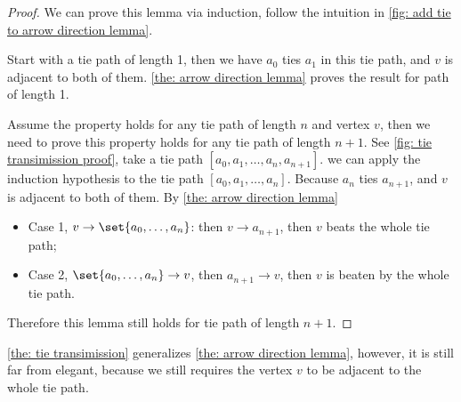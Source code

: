 \begin{proof}
  We can prove this lemma via induction,
  follow the intuition in
  \cref{fig: add tie to arrow direction lemma}.

  Start with a tie path of length 1,
  then we have \(a_0\) ties \(a_1\) in this tie path,
  and \(v\) is adjacent to both of them.
  \cref{the: arrow direction lemma} proves the result
  for path of length 1.

  Assume the property holds for
  any tie path of length \(n\) and vertex \(v\),
  then we need to prove this property holds for
  any tie path of length \(n + 1\).
  See \cref{fig: tie transimission proof},
  take a tie path \([a_0, a_1, \ldots, a_n, a_{n+1}]\).
  we can apply the induction hypothesis to the
  tie path \([a_0, a_1, \ldots, a_n]\).
  Because \(a_n\) ties \(a_{n+1}\), and
  \(v\) is adjacent to both of them.
  By \cref{the: arrow direction lemma}
  \begin{itemize}
    \item
      Case 1, \(v \to \set{a_0, \ldots, a_n}\):
      then \(v \to a_{n+1}\),
      then \(v\) beats the whole tie path;
    \item
      Case 2, \(\set{a_0, \ldots, a_n} \to v\),
      then \(a_{n+1} \to v\),
      then \(v\) is beaten by the whole tie path.
  \end{itemize}
  Therefore this lemma still holds for tie path of length \(n + 1\).
\end{proof}

\cref{the: tie transimission} generalizes
\cref{the: arrow direction lemma},
however, it is still far from elegant,
because we still requires the vertex \(v\)
to be adjacent to the whole tie path.

